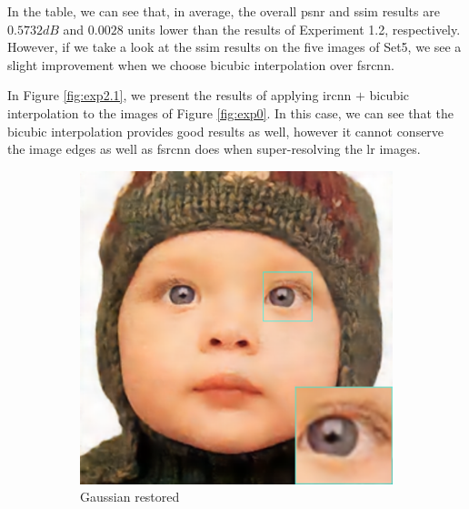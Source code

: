 In the table, we can see that, in average, the overall \gls{psnr} and \gls{ssim} results are $0.5732dB$ and $0.0028$ units lower than the results of Experiment 1.2, respectively. However, if we take a look at the \gls{ssim} results on the five images of Set5, we see a slight improvement when we choose bicubic interpolation over \gls{fsrcnn}.

In Figure \ref{fig:exp2.1}, we present the results of applying \gls{ircnn} $+$ bicubic interpolation to the images of Figure \ref{fig:exp0}. In this case, we can see that the bicubic interpolation provides good results as well, however it cannot conserve the image edges as well as \gls{fsrcnn} does when super-resolving the \gls{lr} images.

\begin{figure}
	\centering
	\begin{subfigure}{0.24\textwidth}
		\includegraphics[width=\textwidth]{images/exp2.1/gaussian.png}
		\caption{Gaussian restored}
	\end{subfigure}
	\begin{subfigure}{0.24\textwidth}

\end{subfigure}
\end{figure}
